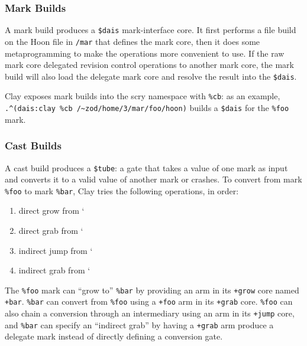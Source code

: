 \documentclass[twoside]{article}
\begin{document}
\subsubsection{Mark Builds}

A mark build produces a \lstinline[style=inlinecode]{$dais} mark-interface core. It first performs a file build on the Hoon file in \lstinline[style=inlinecode]{/mar} that defines the mark core, then it does some metaprogramming to make the operations more convenient to use. If the raw mark core delegated revision control operations to another mark core, the mark build will also load the delegate mark core and resolve the result into the \lstinline[style=inlinecode]{$dais}.

Clay exposes mark builds into the scry namespace with \lstinline[style=inlinecode]{%cb}: as an example, \lstinline[style=inlinecode]{.^(dais:clay %cb /~zod/home/3/mar/foo/hoon)} builds a \lstinline[style=inlinecode]{$dais} for the \lstinline[style=inlinecode]{%foo} mark.

\subsubsection{Cast Builds}

A cast build produces a \lstinline[style=inlinecode]{$tube}: a gate that takes a value of one mark as input and converts it to a valid value of another mark or crashes. To convert from mark \lstinline[style=inlinecode]{%foo} to mark \lstinline[style=inlinecode]{%bar}, Clay tries the following operations, in order:

\begin{enumerate}
  \item  direct grow from `%
  \item  direct grab from `%
  \item  indirect jump from `%
  \item  indirect grab from `%
\end{enumerate}

The \lstinline[style=inlinecode]{%foo} mark can ``grow to'' \lstinline[style=inlinecode]{%bar} by providing an arm in its \lstinline[style=inlinecode]{+grow} core named \lstinline[style=inlinecode]{+bar}. \lstinline[style=inlinecode]{%bar} can convert from \lstinline[style=inlinecode]{%foo} using a \lstinline[style=inlinecode]{+foo} arm in its \lstinline[style=inlinecode]{+grab} core. \lstinline[style=inlinecode]{%foo} can also chain a conversion through an intermediary using an arm in its \lstinline[style=inlinecode]{+jump} core, and \lstinline[style=inlinecode]{%bar} can specify an ``indirect grab'' by having a \lstinline[style=inlinecode]{+grab} arm produce a delegate mark instead of directly defining a conversion gate.
\end{document}
